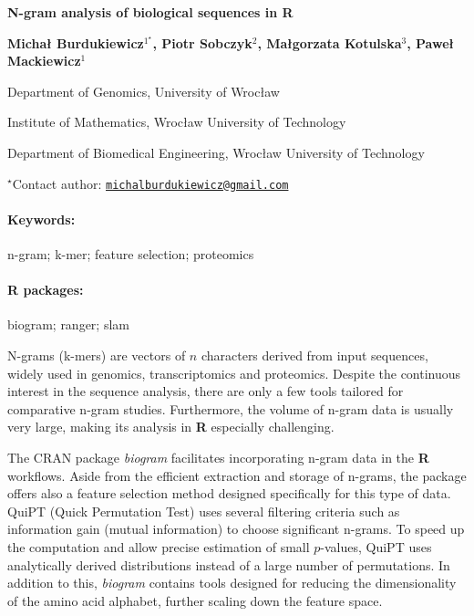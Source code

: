 \documentclass[11pt, a4paper]{article}
\renewcommand{\title}[1]{\begin{center}{\bf \LARGE #1}\end{center}}
\newcommand{\keywords}{\paragraph{Keywords:}}
\newcommand{\packages}{\paragraph{R packages:}}
\begin{document}
\pagestyle{empty}

\title{N-gram analysis of biological sequences in R}

\begin{center}
  {\bf Michał Burdukiewicz$^{1^\star}$, Piotr Sobczyk$^{2}$, Małgorzata Kotulska$^{3}$, Paweł Mackiewicz$^{1}$}
\end{center}

\vskip 0.3cm

\begin{affiliations}
\begin{enumerate}
\begin{minipage}{0.915\textwidth}
\centering
\item Department of Genomics, University of Wrocław \\[-2pt]
\item Institute of Mathematics, Wrocław University of Technology \\[-2pt]
\item Department of Biomedical Engineering, Wrocław University of Technology \\[-2pt]
\end{minipage}
\end{enumerate}
$^\star$Contact author: \href{mailto:michalburdukiewicz@gmail.com}{\nolinkurl{michalburdukiewicz@gmail.com}}\\
\end{affiliations}

\vskip 0.5cm

\begin{minipage}{0.915\textwidth}
\keywords n-gram; k-mer; feature selection; proteomics
\packages biogram; ranger; slam
\end{minipage}

\vskip 0.8cm

N-grams (k-mers) are vectors of \(n\) characters derived from input
sequences, widely used in genomics, transcriptomics and proteomics.
Despite the continuous interest in the sequence analysis, there are only
a few tools tailored for comparative n-gram studies. Furthermore, the
volume of n-gram data is usually very large, making its analysis in
\textbf{R} especially challenging.

The CRAN package \emph{biogram} facilitates incorporating n-gram data in
the \textbf{R} workflows. Aside from the efficient extraction and
storage of n-grams, the package offers also a feature selection method
designed specifically for this type of data. QuiPT (Quick Permutation
Test) uses several filtering criteria such as information gain (mutual
information) to choose significant n-grams. To speed up the computation
and allow precise estimation of small \(p\)-values, QuiPT uses
analytically derived distributions instead of a large number of
permutations. In addition to this, \emph{biogram} contains tools
designed for reducing the dimensionality of the amino acid alphabet,
further scaling down the feature space.
\end{document}
